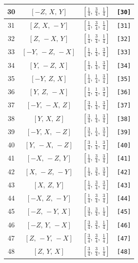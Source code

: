 \documentclass[fleqn,8pt]{jsarticle}
\begin{document}
\begin{longtable}{cccc}
30 & $\left[ - Z,\, X,\, Y \right]$ & $\left[ \frac{1}{4},\, \frac{3}{4},\, \frac{1}{4} \right]$ & {\tt [30]} \\ \hline
31 & $\left[ Z,\, X,\, - Y \right]$ & $\left[ \frac{1}{4},\, \frac{3}{4},\, \frac{1}{4} \right]$ & {\tt [31]} \\ \hline
32 & $\left[ Z,\, - X,\, Y \right]$ & $\left[ \frac{1}{4},\, \frac{3}{4},\, \frac{1}{4} \right]$ & {\tt [32]} \\ \hline
33 & $\left[ - Y,\, - Z,\, - X \right]$ & $\left[ \frac{1}{4},\, \frac{1}{4},\, \frac{3}{4} \right]$ & {\tt [33]} \\ \hline
34 & $\left[ Y,\, - Z,\, X \right]$ & $\left[ \frac{1}{4},\, \frac{1}{4},\, \frac{3}{4} \right]$ & {\tt [34]} \\ \hline
35 & $\left[ - Y,\, Z,\, X \right]$ & $\left[ \frac{1}{4},\, \frac{1}{4},\, \frac{3}{4} \right]$ & {\tt [35]} \\ \hline
36 & $\left[ Y,\, Z,\, - X \right]$ & $\left[ \frac{1}{4},\, \frac{1}{4},\, \frac{3}{4} \right]$ & {\tt [36]} \\ \hline
37 & $\left[ - Y,\, - X,\, Z \right]$ & $\left[ \frac{3}{4},\, \frac{1}{4},\, \frac{3}{4} \right]$ & {\tt [37]} \\ \hline
38 & $\left[ Y,\, X,\, Z \right]$ & $\left[ \frac{3}{4},\, \frac{1}{4},\, \frac{3}{4} \right]$ & {\tt [38]} \\ \hline
39 & $\left[ - Y,\, X,\, - Z \right]$ & $\left[ \frac{3}{4},\, \frac{1}{4},\, \frac{3}{4} \right]$ & {\tt [39]} \\ \hline
40 & $\left[ Y,\, - X,\, - Z \right]$ & $\left[ \frac{3}{4},\, \frac{1}{4},\, \frac{3}{4} \right]$ & {\tt [40]} \\ \hline
41 & $\left[ - X,\, - Z,\, Y \right]$ & $\left[ \frac{1}{4},\, \frac{3}{4},\, \frac{3}{4} \right]$ & {\tt [41]} \\ \hline
42 & $\left[ X,\, - Z,\, - Y \right]$ & $\left[ \frac{1}{4},\, \frac{3}{4},\, \frac{3}{4} \right]$ & {\tt [42]} \\ \hline
43 & $\left[ X,\, Z,\, Y \right]$ & $\left[ \frac{1}{4},\, \frac{3}{4},\, \frac{3}{4} \right]$ & {\tt [43]} \\ \hline
44 & $\left[ - X,\, Z,\, - Y \right]$ & $\left[ \frac{1}{4},\, \frac{3}{4},\, \frac{3}{4} \right]$ & {\tt [44]} \\ \hline
45 & $\left[ - Z,\, - Y,\, X \right]$ & $\left[ \frac{3}{4},\, \frac{3}{4},\, \frac{1}{4} \right]$ & {\tt [45]} \\ \hline
46 & $\left[ - Z,\, Y,\, - X \right]$ & $\left[ \frac{3}{4},\, \frac{3}{4},\, \frac{1}{4} \right]$ & {\tt [46]} \\ \hline
47 & $\left[ Z,\, - Y,\, - X \right]$ & $\left[ \frac{3}{4},\, \frac{3}{4},\, \frac{1}{4} \right]$ & {\tt [47]} \\ \hline
48 & $\left[ Z,\, Y,\, X \right]$ & $\left[ \frac{3}{4},\, \frac{3}{4},\, \frac{1}{4} \right]$ & {\tt [48]} \\
\end{longtable}
\end{document}
